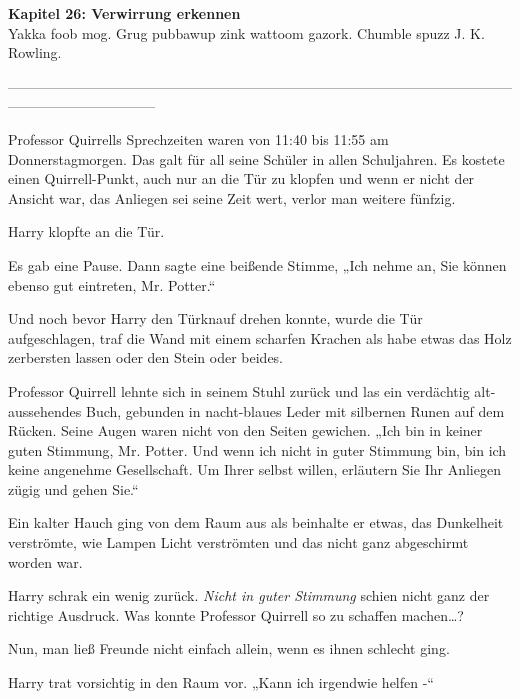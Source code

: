 

\hypertarget{verwirrung-erkennen}{%

\textbf{Kapitel 26: Verwirrung erkennen}\\

Yakka foob mog. Grug pubbawup zink wattoom gazork. Chumble spuzz J. K. Rowling.

--------------------------------------------------------------------------------------------------------------------------------------------

Professor Quirrells Sprechzeiten waren von 11:40 bis 11:55 am Donnerstagmorgen. Das galt für all seine Schüler in allen Schuljahren. Es kostete einen Quirrell-Punkt, auch nur an die Tür zu klopfen und wenn er nicht der Ansicht war, das Anliegen sei seine Zeit wert, verlor man weitere fünfzig.

Harry klopfte an die Tür.

Es gab eine Pause. Dann sagte eine beißende Stimme, „Ich nehme an, Sie können ebenso gut eintreten, Mr. Potter.“

Und noch bevor Harry den Türknauf drehen konnte, wurde die Tür aufgeschlagen, traf die Wand mit einem scharfen Krachen als habe etwas das Holz zerbersten lassen oder den Stein oder beides.

Professor Quirrell lehnte sich in seinem Stuhl zurück und las ein verdächtig alt-aussehendes Buch, gebunden in nacht-blaues Leder mit silbernen Runen auf dem Rücken. Seine Augen waren nicht von den Seiten gewichen. „Ich bin in keiner guten Stimmung, Mr. Potter. Und wenn ich nicht in guter Stimmung bin, bin ich keine angenehme Gesellschaft. Um Ihrer selbst willen, erläutern Sie Ihr Anliegen zügig und gehen Sie.“

Ein kalter Hauch ging von dem Raum aus als beinhalte er etwas, das Dunkelheit verströmte, wie Lampen Licht verströmten und das nicht ganz abgeschirmt worden war.

Harry schrak ein wenig zurück. \emph{Nicht in guter Stimmung} schien nicht ganz der richtige Ausdruck. Was konnte Professor Quirrell so zu schaffen machen…?

Nun, man ließ Freunde nicht einfach allein, wenn es ihnen schlecht ging.

Harry trat vorsichtig in den Raum vor. „Kann ich irgendwie helfen -“

}
